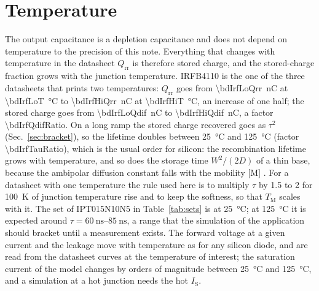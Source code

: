 \documentclass[10pt,a4paper]{scrartcl}
\newcommand{\Qrr}{Q_\mathrm{rr}}
\newcommand{\TM}{T_\mathrm{M}}
\newcommand{\IS}{I_\mathrm{S}}
\newcommand{\IPT}{IPT015N10N5}
\newcommand{\IRF}{IRFB4110}
\begin{document}
\section{Temperature}
\label{sec:temperature}
The output capacitance is a depletion capacitance and does not depend on temperature to the precision of this note. Everything that changes with temperature in the datasheet $\Qrr$ is therefore stored charge, and the stored-charge fraction grows with the junction temperature. \IRF{} is the one of the three datasheets that prints two temperatures: $\Qrr$ goes from \SI{\bdIrfLoQrr}{\nano\coulomb} at \SI{\bdIrfLoT}{\celsius} to \SI{\bdIrfHiQrr}{\nano\coulomb} at \SI{\bdIrfHiT}{\celsius}, an increase of one half; the stored charge goes from \SI{\bdIrfLoQdif}{\nano\coulomb} to \SI{\bdIrfHiQdif}{\nano\coulomb}, a factor \num{\bdIrfQdifRatio}. On a long ramp the stored charge recovered goes as $\tau^2$ (Sec.~\ref{sec:bracket}), so the lifetime doubles between \SI{25}{\celsius} and \SI{125}{\celsius} (factor \num{\bdIrfTauRatio}), which is the usual order for silicon: the recombination lifetime grows with temperature, and so does the storage time $W^2/(2D)$ of a thin base, because the ambipolar diffusion constant falls with the mobility [M] \cite{lutz}. For a datasheet with one temperature the rule used here is to multiply $\tau$ by 1.5 to 2 for \SI{100}{\kelvin} of junction temperature rise and to keep the softness, so that $\TM$ scales with it. The set of \IPT{} in Table~\ref{tab:sets} is at \SI{25}{\celsius}; at \SI{125}{\celsius} it is expected around $\tau = \SIrange{60}{85}{\nano\second}$, a range that the simulation of the application should bracket until a measurement exists. The forward voltage at a given current and the leakage move with temperature as for any silicon diode, and are read from the datasheet curves at the temperature of interest; the saturation current of the model changes by orders of magnitude between \SI{25}{\celsius} and \SI{125}{\celsius}, and a simulation at a hot junction needs the hot $\IS$.

\end{document}
